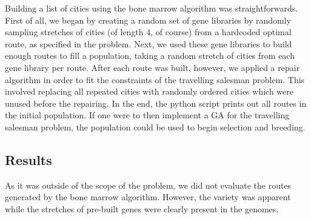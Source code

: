 Building a list of cities using the bone marrow algorithm was straightforwards.  First of all, we began by creating a random set of gene libraries by randomly sampling stretches of cities (of length 4, of course) from a hardcoded optimal route, as specified in the problem.  Next, we used these gene libraries to build enough routes to fill a population, taking a random stretch of cities from each gene library per route.  After each route was built, however, we applied a repair algorithm in order to fit the constraints of the travelling salesman problem. This involved replacing all repeated cities with randomly ordered cities which were unused before the repairing.  In the end, the python script prints out all routes in the initial population.  If one were to then implement a GA for the travelling salesman problem, the population could be used to begin selection and breeding.

\subsection{Results}

As it was outside of the scope of the problem, we did not evaluate the routes generated by the bone marrow algorithm.  However, the variety was apparent while the stretches of pre-built genes were clearly present in the genomes. 